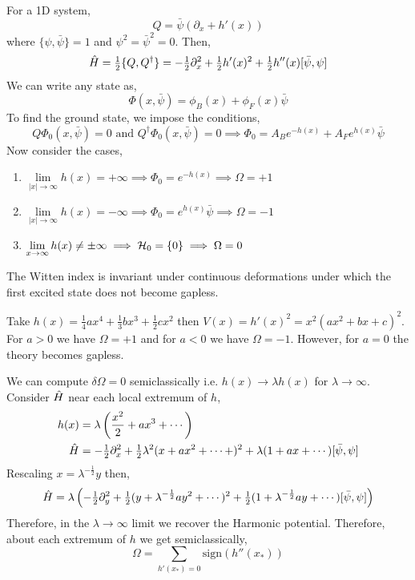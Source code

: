 \documentclass[12pt]{extarticle}
\begin{document}
\begin{example}
For a 1D system,
\[ Q = \bar{\psi} \left( \partial_x + h'(x) \right) \]
where $\{ \psi, \bar{\psi} \} = 1$ and $\psi^2 = \bar{\psi}^2 = 0$. Then,
\[ \hat{H} = \tfrac{1}{2} \{ Q, Q^\dagger \} = -\tfrac{1}{2} \partial_x^2 + \tfrac{1}{2} h'(x)^2 + \tfrac{1}{2} h''(x) [\bar{\psi}, \psi] \]
We can write any state as,
\[ \Phi(x, \bar{\psi}) = \phi_B(x) + \phi_F(x) \bar{\psi} \]
To find the ground state, we impose the conditions,
\[ Q \Phi_0(x, \bar{\psi}) = 0 \text{ and } Q^\dagger \Phi_0(x, \bar{\psi}) = 0 \implies \Phi_0 = A_B e^{-h(x)} + A_F e^{h(x)} \bar{\psi} \]
Now consider the cases,
\begin{enumerate}
\item $\lim\limits_{|x| \to \infty} h(x) = + \infty \implies \Phi_0 = e^{-h(x)} \implies \Omega = + 1$

\item $\lim\limits_{|x| \to \infty} h(x) = - \infty \implies \Phi_0 = e^{h(x)} \bar{\psi} \implies \Omega = - 1$

\item $\lim\limits_{x \to \infty} h(x) \neq \pm\infty \implies \mathcal{H}_0 = \{ 0 \} \implies \Omega = 0$
\end{enumerate}
\end{example}

\begin{theorem}
The Witten index is invariant under continuous deformations under which the first excited state does not become gapless.
\end{theorem}

\begin{example}
Take $h(x) = \tfrac{1}{4} a x^4 + \tfrac{1}{3} b x^3 + \tfrac{1}{2} c x^2$ then $V(x) = h'(x)^2 = x^2 (a x^2 + b x + c)^2$. For $a > 0$ we have $\Omega = + 1$ and for $a < 0$ we have $\Omega = -1$. However, for $a = 0$ the theory becomes gapless. 
\end{example}

\begin{theorem}
We can compute $\delta \Omega = 0$ semiclassically i.e. $h(x) \to \lambda h(x)$ for $\lambda \to \infty$. Consider $\hat{H}$ near each local extremum of $h$,
\begin{align*}
h(x) & = \lambda \left( \frac{x^2}{2} + a x^3 + \cdots \right)
\\
\hat{H} & = - \tfrac{1}{2} \partial_x^2 + \tfrac{1}{2} \lambda^2 (x + a x^2 + \cdots +)^2 + \lambda(1 + a x + \cdots ) [\bar{\psi}, \psi]
\end{align*}
Rescaling $x = \lambda^{-\frac{1}{2}} y$ then,
\begin{align*}
\hat{H} = \lambda \left( - \tfrac{1}{2} \partial_y^2 + \tfrac{1}{2} (y + \lambda^{-\frac{1}{2}} a y^2 + \cdots )^2 + \tfrac{1}{2} (1 + \lambda^{-\frac{1}{2}} a y + \cdots) [\bar{\psi}, \psi] \right) 
\end{align*}
Therefore, in the $\lambda \to \infty$ limit we recover the Harmonic potential. Therefore, about each extremum of $h$ we get semiclassically,
\[ \Omega = \sum_{h'(x_*) = 0} \mathrm{sign}(h''(x_*)) \] 
\end{theorem}
\end{document}
